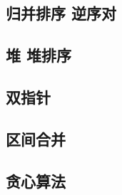 \subsection{归并排序 \quad 逆序对}

\subsection{堆 \quad 堆排序}

\subsection{双指针}

\subsection{区间合并}

\subsection{贪心算法}